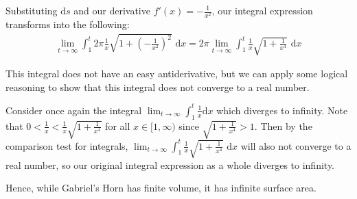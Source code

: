 \documentclass{article}[11pt]
\begin{document}
Substituting $\textrm{d}s$ and our derivative $f'(x) = -\frac1{x^2}$, our integral expression transforms into the following:
\begin{gather*}
\lim_{t \to \infty}\int_{1}^{t}2\pi\frac1x \sqrt{1 + (-\frac1{x^2})^2} \, \, \textrm{d}x = 2\pi\lim_{t \to \infty}\int_{1}^{t}\frac1x \sqrt{1 + \frac1{x^4}} \, \, \textrm{d}x
\end{gather*}

This integral does not have an easy antiderivative, but we can apply some logical reasoning to show that this integral does not converge to a real number.

Consider once again the integral $\lim_{t \to \infty}\int_1^{t}\frac{1}{x}\textrm{d}{x}$ which diverges to infinity. Note that $0 < \frac1x < \frac1x \sqrt{1 + \frac1{x^4}}$ for all $x\in[1, \infty)$ since $\sqrt{1 + \frac1{x^4}} > 1$. Then by the comparison test for integrals, $\lim_{t \to \infty}\int_{1}^{t}\frac1x \sqrt{1 + \frac1{x^4}} \, \, \textrm{d}x$ will also not converge to a real number, so our original integral expression as a whole diverges to infinity.

\hspace{11pt}

Hence, while Gabriel's Horn has finite volume, it has infinite surface area.
\end{document}
